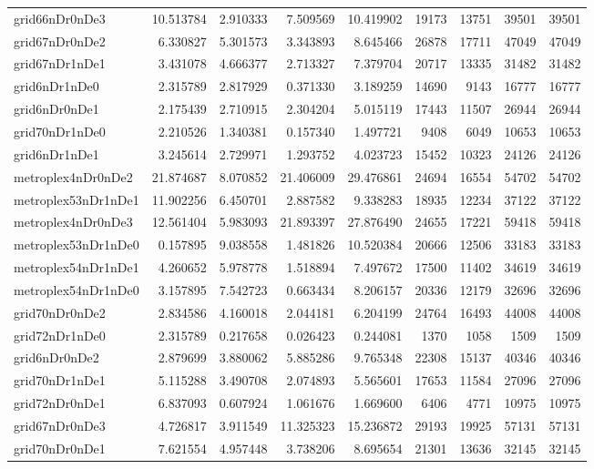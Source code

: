 \begin{longtable}{|l|r|r|r|r|r|r|r|r|}
grid66nDr0nDe3 & 10.513784 & 2.910333 & 7.509569 & 10.419902 & 19173 & 13751 & 39501 & 39501 \\
grid67nDr0nDe2 & 6.330827 & 5.301573 & 3.343893 & 8.645466 & 26878 & 17711 & 47049 & 47049 \\
grid67nDr1nDe1 & 3.431078 & 4.666377 & 2.713327 & 7.379704 & 20717 & 13335 & 31482 & 31482 \\
grid6nDr1nDe0 & 2.315789 & 2.817929 & 0.371330 & 3.189259 & 14690 & 9143 & 16777 & 16777 \\
grid6nDr0nDe1 & 2.175439 & 2.710915 & 2.304204 & 5.015119 & 17443 & 11507 & 26944 & 26944 \\
grid70nDr1nDe0 & 2.210526 & 1.340381 & 0.157340 & 1.497721 & 9408 & 6049 & 10653 & 10653 \\
grid6nDr1nDe1 & 3.245614 & 2.729971 & 1.293752 & 4.023723 & 15452 & 10323 & 24126 & 24126 \\
metroplex4nDr0nDe2 & 21.874687 & 8.070852 & 21.406009 & 29.476861 & 24694 & 16554 & 54702 & 54702 \\
metroplex53nDr1nDe1 & 11.902256 & 6.450701 & 2.887582 & 9.338283 & 18935 & 12234 & 37122 & 37122 \\
metroplex4nDr0nDe3 & 12.561404 & 5.983093 & 21.893397 & 27.876490 & 24655 & 17221 & 59418 & 59418 \\
metroplex53nDr1nDe0 & 0.157895 & 9.038558 & 1.481826 & 10.520384 & 20666 & 12506 & 33183 & 33183 \\
metroplex54nDr1nDe1 & 4.260652 & 5.978778 & 1.518894 & 7.497672 & 17500 & 11402 & 34619 & 34619 \\
metroplex54nDr1nDe0 & 3.157895 & 7.542723 & 0.663434 & 8.206157 & 20336 & 12179 & 32696 & 32696 \\
grid70nDr0nDe2 & 2.834586 & 4.160018 & 2.044181 & 6.204199 & 24764 & 16493 & 44008 & 44008 \\
grid72nDr1nDe0 & 2.315789 & 0.217658 & 0.026423 & 0.244081 & 1370 & 1058 & 1509 & 1509 \\
grid6nDr0nDe2 & 2.879699 & 3.880062 & 5.885286 & 9.765348 & 22308 & 15137 & 40346 & 40346 \\
grid70nDr1nDe1 & 5.115288 & 3.490708 & 2.074893 & 5.565601 & 17653 & 11584 & 27096 & 27096 \\
grid72nDr0nDe1 & 6.837093 & 0.607924 & 1.061676 & 1.669600 & 6406 & 4771 & 10975 & 10975 \\
grid67nDr0nDe3 & 4.726817 & 3.911549 & 11.325323 & 15.236872 & 29193 & 19925 & 57131 & 57131 \\
grid70nDr0nDe1 & 7.621554 & 4.957448 & 3.738206 & 8.695654 & 21301 & 13636 & 32145 & 32145 \\

\end{longtable}
